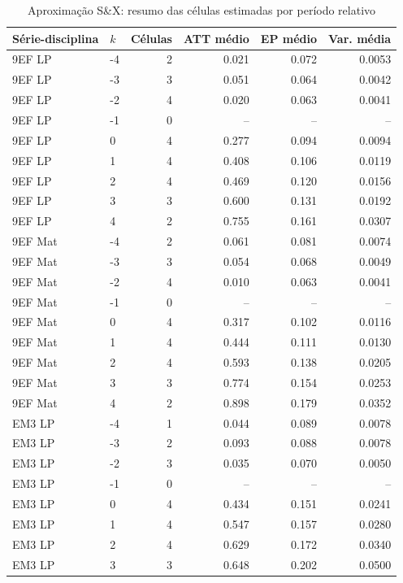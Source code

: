 \begin{table}[!htbp]
\centering
\caption{Aproximação S\&X: resumo das células estimadas por período relativo}
\label{tab:ap_sx_resumo_periodo}
\vspace{-0.15cm}
\scriptsize
\setlength{\tabcolsep}{4pt}
\renewcommand{\arraystretch}{0.92}
\begin{tabular}{llrrrr}
\toprule
Série-disciplina & \(k\) & Células & ATT médio & EP médio & Var. média \\
\midrule
9EF LP & -4 & 2 & 0.021 & 0.072 & 0.0053 \\
9EF LP & -3 & 3 & 0.051 & 0.064 & 0.0042 \\
9EF LP & -2 & 4 & 0.020 & 0.063 & 0.0041 \\
9EF LP & -1 & 0 & -- & -- & -- \\
9EF LP & 0 & 4 & 0.277 & 0.094 & 0.0094 \\
9EF LP & 1 & 4 & 0.408 & 0.106 & 0.0119 \\
9EF LP & 2 & 4 & 0.469 & 0.120 & 0.0156 \\
9EF LP & 3 & 3 & 0.600 & 0.131 & 0.0192 \\
9EF LP & 4 & 2 & 0.755 & 0.161 & 0.0307 \\
9EF Mat & -4 & 2 & 0.061 & 0.081 & 0.0074 \\
9EF Mat & -3 & 3 & 0.054 & 0.068 & 0.0049 \\
9EF Mat & -2 & 4 & 0.010 & 0.063 & 0.0041 \\
9EF Mat & -1 & 0 & -- & -- & -- \\
9EF Mat & 0 & 4 & 0.317 & 0.102 & 0.0116 \\
9EF Mat & 1 & 4 & 0.444 & 0.111 & 0.0130 \\
9EF Mat & 2 & 4 & 0.593 & 0.138 & 0.0205 \\
9EF Mat & 3 & 3 & 0.774 & 0.154 & 0.0253 \\
9EF Mat & 4 & 2 & 0.898 & 0.179 & 0.0352 \\
EM3 LP & -4 & 1 & 0.044 & 0.089 & 0.0078 \\
EM3 LP & -3 & 2 & 0.093 & 0.088 & 0.0078 \\
EM3 LP & -2 & 3 & 0.035 & 0.070 & 0.0050 \\
EM3 LP & -1 & 0 & -- & -- & -- \\
EM3 LP & 0 & 4 & 0.434 & 0.151 & 0.0241 \\
EM3 LP & 1 & 4 & 0.547 & 0.157 & 0.0280 \\
EM3 LP & 2 & 4 & 0.629 & 0.172 & 0.0340 \\
EM3 LP & 3 & 3 & 0.648 & 0.202 & 0.0500 \\

\end{tabular}
\end{table}
